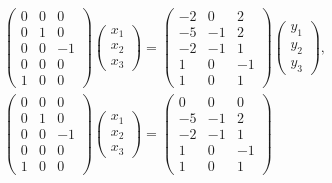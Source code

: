 \documentclass[12pt]{article}
\begin{document}
\begin{enumerate}
\begin{gather*}
            \begin{pmatrix}
                0 & 0 & 0  \\
                0 & 1 & 0  \\
                0 & 0 & -1 \\
                0 & 0 & 0  \\
                1 & 0 & 0
            \end{pmatrix}
            \begin{pmatrix}
                x_1 \\ x_2 \\ x_3
            \end{pmatrix}
            =
            \begin{pmatrix}
                -2 & 0  & 2  \\
                -5 & -1 & 2  \\
                -2 & -1 & 1  \\
                1  & 0  & -1 \\
                1  & 0  & 1
            \end{pmatrix}
            \begin{pmatrix}
                y_1 \\ y_2 \\ y_3
            \end{pmatrix} , \\
            \begin{pmatrix}
                0 & 0 & 0  \\
                0 & 1 & 0  \\
                0 & 0 & -1 \\
                0 & 0 & 0  \\
                1 & 0 & 0
            \end{pmatrix}
            \begin{pmatrix}
                x_1 \\ x_2 \\ x_3
            \end{pmatrix}
            =
            \begin{pmatrix}
                0  & 0  & 0  \\
                -5 & -1 & 2  \\
                -2 & -1 & 1  \\
                1  & 0  & -1 \\
                1  & 0  & 1
            \end{pmatrix}

\end{gather*}
\end{enumerate}
\end{document}
